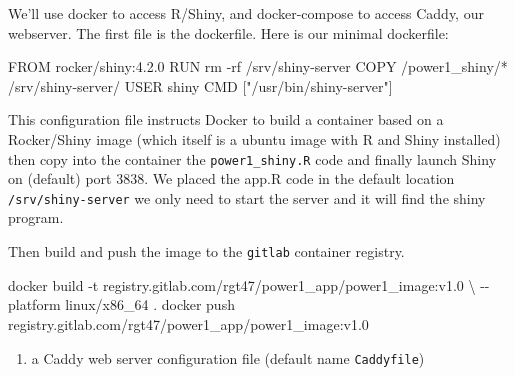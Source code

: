 \documentclass[
  letterpaper,
  DIV=11,
  numbers=noendperiod,
  oneside]{scrartcl}
\newenvironment{Shaded}{\begin{snugshade}}{\end{snugshade}}
\newcommand{\AttributeTok}[1]{\textcolor[rgb]{0.40,0.45,0.13}{#1}}
\newcommand{\DataTypeTok}[1]{\textcolor[rgb]{0.68,0.00,0.00}{#1}}
\newcommand{\DecValTok}[1]{\textcolor[rgb]{0.68,0.00,0.00}{#1}}
\newcommand{\ErrorTok}[1]{\textcolor[rgb]{0.68,0.00,0.00}{#1}}
\newcommand{\ExtensionTok}[1]{\textcolor[rgb]{0.00,0.23,0.31}{#1}}
\newcommand{\FloatTok}[1]{\textcolor[rgb]{0.68,0.00,0.00}{#1}}
\newcommand{\NormalTok}[1]{\textcolor[rgb]{0.00,0.23,0.31}{#1}}
\newcommand{\SpecialCharTok}[1]{\textcolor[rgb]{0.37,0.37,0.37}{#1}}
\newcommand{\StringTok}[1]{\textcolor[rgb]{0.13,0.47,0.30}{#1}}
\providecommand{\tightlist}{%
  \setlength{\itemsep}{0pt}\setlength{\parskip}{0pt}}\usepackage{longtable,booktabs,array}
\begin{document}
We'll use docker to access R/Shiny, and docker-compose to access Caddy,
our webserver. The first file is the dockerfile. Here is our minimal
dockerfile:

\begin{Shaded}
\begin{Highlighting}[]
\NormalTok{FROM rocker}\SpecialCharTok{/}\NormalTok{shiny}\SpecialCharTok{:}\DecValTok{4}\NormalTok{.}\FloatTok{2.0}
\NormalTok{RUN rm }\SpecialCharTok{{-}}\NormalTok{rf }\SpecialCharTok{/}\NormalTok{srv}\SpecialCharTok{/}\NormalTok{shiny}\SpecialCharTok{{-}}\NormalTok{server}
\NormalTok{COPY }\SpecialCharTok{/}\NormalTok{power1\_shiny}\SpecialCharTok{/}\ErrorTok{*} \ErrorTok{/}\NormalTok{srv}\SpecialCharTok{/}\NormalTok{shiny}\SpecialCharTok{{-}}\NormalTok{server}\SpecialCharTok{/}
\NormalTok{USER shiny}
\NormalTok{CMD [}\StringTok{"/usr/bin/shiny{-}server"}\NormalTok{]}
\end{Highlighting}
\end{Shaded}

{}

This configuration file instructs Docker to build a container based on a
Rocker/Shiny image (which itself is a ubuntu image with R and Shiny
installed) then copy into the container the \texttt{power1\_shiny.R}
code and finally launch Shiny on (default) port 3838. We placed the
app.R code in the default location \texttt{/srv/shiny-server} we only
need to start the server and it will find the shiny program.

Then build and push the image to the \texttt{gitlab} container registry.

\begin{Shaded}
\begin{Highlighting}[]
\ExtensionTok{docker}\NormalTok{ build }\AttributeTok{{-}t}\NormalTok{ registry.gitlab.com/rgt47/power1\_app/power1\_image:v1.0 }\DataTypeTok{\textbackslash{}}
        \AttributeTok{{-}{-}platform}\NormalTok{ linux/x86\_64 .}
\ExtensionTok{docker}\NormalTok{ push registry.gitlab.com/rgt47/power1\_app/power1\_image:v1.0}
\end{Highlighting}
\end{Shaded}

\begin{enumerate}
\def\labelenumi{\arabic{enumi}.}
\setcounter{enumi}{1}
\tightlist
\item
  a Caddy web server configuration file (default name
  \texttt{Caddyfile})
\end{enumerate}
\end{document}
